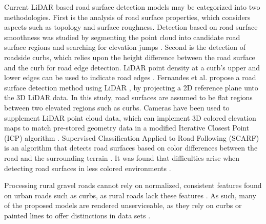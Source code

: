 \documentclass[journal,onecolumn]{IEEEtran}
\begin{document}
	{Current LiDAR based road surface detection models may be categorized into two methodologies. First is the analysis of road surface properties, which considers aspects such as topology and surface roughness. Detection based on road surface smoothness was studied by segmenting the point cloud into candidate road surface regions and searching for elevation jumps \cite{liu_new_2013}. Second is the detection of roadside curbs, which relies upon the height difference between the road surface and the curb for road edge detection. LiDAR point density at a curb's upper and lower edges can be used to indicate road edges \cite{ibrahim_curb-based_2012}. Fernandes et al. propose a road surface detection method using LiDAR \cite{fernandes_road_2014}, by projecting a 2D reference plane unto the 3D LiDAR data. In this study, road surfaces are assumed to be flat regions between two elevated regions such as curbs. Cameras have been used to supplement LiDAR point cloud data, which can implement 3D colored elevation maps to match pre-stored geometry data in a modified Iterative Closest Point (ICP) algorithm \cite{manz_detection_2011}. Supervised Classification Applied to Road Following (SCARF) is an algorithm that detects road surfaces based on color differences between the road and the surrounding terrain \cite{crisman_scarf_1993}. It was found that difficulties arise when detecting road surfaces in less colored environments \cite{crisman_scarf_1993,manz_detection_2011}.}

	{Processing rural gravel roads cannot rely on normalized, consistent features found on urban roads such as curbs, as rural roads lack these features \cite{skorseth_gravel_nodate}. As such, many of the proposed models are rendered unserviceable, as they rely on curbs or painted lines to offer distinctions in data sets \cite{yadav_extraction_2017,liu_new_2013,qiu_fast_2016,fernandes_road_2014,seker_experiments_nodate,yang_semi-automated_2013,miyazaki_line-based_2014,hervieu_road_2013,smadja_road_nodate}.}
\end{document}
